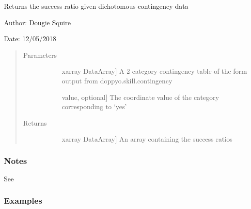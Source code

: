 \documentclass[letterpaper,10pt,english]{sphinxmanual}
\begin{document}

\begin{fulllineitems}
\label{\detokenize{skill_doc:skill.success_ratio}}
Returns the success ratio given dichotomous contingency data

\begin{DUlineblock}{0em}
\item[] Author: Dougie Squire
\item[] Date: 12/05/2018
\end{DUlineblock}
\begin{quote}\begin{description}
\item[{Parameters}] \leavevmode\begin{description}
\item[{}] \leavevmode{[}xarray DataArray{]}
A 2 category contingency table of the form output from doppyo.skill.contingency

\item[{}] \leavevmode{[}value, optional{]}
The coordinate value of the category corresponding to ‘yes’

\end{description}

\item[{Returns}] \leavevmode\begin{description}
\item[{}] \leavevmode{[}xarray DataArray{]}
An array containing the success ratios

\end{description}

\end{description}\end{quote}
\subsubsection*{Notes}

See 
\subsubsection*{Examples}


\end{fulllineitems}
\end{document}
